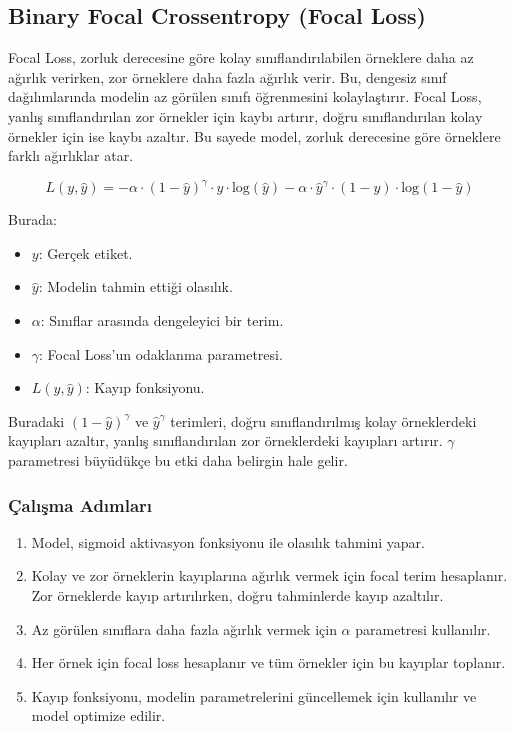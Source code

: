 \newpage

\subsection{Binary Focal Crossentropy (Focal Loss)}

Focal Loss, zorluk derecesine göre kolay sınıflandırılabilen örneklere daha az ağırlık verirken, zor örneklere daha fazla ağırlık verir. Bu, dengesiz sınıf dağılımlarında modelin az görülen sınıfı öğrenmesini kolaylaştırır. Focal Loss, yanlış sınıflandırılan zor örnekler için kaybı artırır, doğru sınıflandırılan kolay örnekler için ise kaybı azaltır. Bu sayede model, zorluk derecesine göre örneklere farklı ağırlıklar atar. 

\[ L(y, \hat{y}) = - \alpha \cdot (1 - \hat{y})^{\gamma} \cdot y \cdot \text{log}(\hat{y}) - \alpha \cdot \hat{y}^{\gamma} \cdot (1 - y) \cdot \text{log}(1 - \hat{y}) \]

Burada:

\begin{itemize}
    \item $y$: Gerçek etiket.
    \item $\hat{y}$: Modelin tahmin ettiği olasılık.
    \item $\alpha$: Sınıflar arasında dengeleyici bir terim.
    \item $\gamma$: Focal Loss'un odaklanma parametresi.
    \item $L(y, \hat{y})$: Kayıp fonksiyonu.
\end{itemize}

Buradaki $(1 - \hat{y})^{\gamma}$ ve $\hat{y}^{\gamma}$ terimleri, doğru sınıflandırılmış kolay örneklerdeki kayıpları azaltır, yanlış sınıflandırılan zor örneklerdeki kayıpları artırır. $\gamma$ parametresi büyüdükçe bu etki daha belirgin hale gelir.

\subsubsection{Çalışma Adımları}

\begin{enumerate}
    \item Model, sigmoid aktivasyon fonksiyonu ile olasılık tahmini yapar.
    \item Kolay ve zor örneklerin kayıplarına ağırlık vermek için focal terim hesaplanır. Zor örneklerde kayıp artırılırken, doğru tahminlerde kayıp azaltılır.
    \item Az görülen sınıflara daha fazla ağırlık vermek için $\alpha$ parametresi kullanılır.
    \item Her örnek için focal loss hesaplanır ve tüm örnekler için bu kayıplar toplanır.
    \item Kayıp fonksiyonu, modelin parametrelerini güncellemek için kullanılır ve model optimize edilir.
\end{enumerate}

